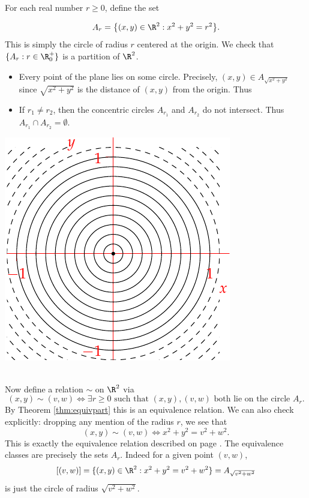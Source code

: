 \begin{example}
For each real number $r\ge 0$, define the set\\
\noindent\begin{minipage}{0.63\textwidth}
\[A_r=\bigl\{(x,y)\in\R^2:x^2+y^2=r^2\bigr\}.\]
This is simply the circle of radius $r$ centered at the origin. We check that $\{A_r:r\in\R^+_0\}$ is a partition of $\R^2$.
\begin{itemize}
  \item Every point of the plane lies on some circle. Precisely, $(x,y)\in A_{\sqrt{x^2+y^2}}$ since $\sqrt{x^2+y^2}$ is the distance of $(x,y)$ from the origin. Thus 
  \item If $r_1\neq r_2$, then the concentric circles $A_{r_1}$ and $A_{r_2}$ do not intersect. Thus $A_{r_1}\cap A_{r_2}=\emptyset$.
\end{itemize}
\end{minipage}\hfill
\begin{minipage}{0.32\textwidth}
\includegraphics[width=\textwidth]{relations-09-circles}
\end{minipage}\\

\noindent Now define a relation $\sim$ on $\R^2$ via
\[(x,y)\sim(v,w)\iff \exists r\ge 0\text{ such that $(x,y),(v,w)$ both lie on the circle $A_r$}.\]
By Theorem \ref{thm:equivpart} this is an equivalence relation. We can also check explicitly: dropping any mention of the radius $r$, we see that
\[(x,y)\sim(v,w)\iff x^2+y^2=v^2+w^2.\]
This is exactly the equivalence relation described on page \pageref{ex:equivcircle}. The equivalence classes are precisely the sets $A_r$. Indeed for a given point $(v,w)$,
\[[(v,w)]=\{(x,y)\in\R^2:x^2+y^2=v^2+w^2\}=A_{\sqrt{v^2+w^2}}\]
is just the circle of radius $\sqrt{v^2+w^2}$.
\end{example}

